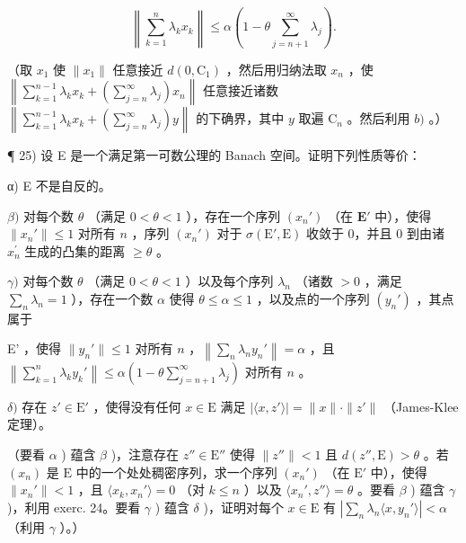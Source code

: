 \[
\left\| \sum_ {k = 1} ^ {n} \lambda_ {k} x _ {k} \right\| \leqslant \alpha (1 - \theta \sum_ {j = n + 1} ^ {\infty} \lambda_ {j}).
\]

（取 \(x_{1}\) 使 \(\| x_{1}\|\) 任意接近 \(d(0, \mathrm{C}_{1})\) ，然后用归纳法取 \(x_{n}\) ，使 \(\left\| \sum_{k=1}^{n-1} \lambda_{k} x_{k} + \left(\sum_{j=n}^{\infty} \lambda_{j}\right) x_{n}\right\|\) 任意接近诸数 \(\left\| \sum_{k=1}^{n-1} \lambda_{k} x_{k} + \left(\sum_{j=n}^{\infty} \lambda_{j}\right) y\right\|\) 的下确界，其中 \(y\) 取遍 \(\mathrm{C}_n\) 。然后利用 \(b)\) 。）

¶ 25) 设 E 是一个满足第一可数公理的 Banach 空间。证明下列性质等价：

α) E 不是自反的。

\(\beta)\) 对每个数 \(\theta\) （满足 \(0 < \theta < 1\) ），存在一个序列 \((x_n')\) （在 \(\mathbf{E}'\) 中），使得 \(\| x_n'\| \leqslant 1\) 对所有 \(n\) ，序列 \((x_n')\) 对于 \(\sigma (\mathrm{E}',\mathrm{E})\) 收敛于 0，并且 0 到由诸 \(x_{n}^{\prime}\) 生成的凸集的距离 \(\geqslant \theta\) 。

\(\gamma)\) 对每个数 \(\theta\) （满足 \(0 < \theta < 1\) ）以及每个序列 \(\lambda_{n}\) （诸数 \(>0\) ，满足 \(\sum_{n} \lambda_{n} = 1\) ），存在一个数 \(\alpha\) 使得 \(\theta \leqslant \alpha \leqslant 1\) ，以及点的一个序列 \((y_{n}')\) ，其点属于

E' ，使得 \(\| y_n'\| \leqslant 1\) 对所有 \(n\) ，\(\left\| \sum_{n}\lambda_ny_n'\right\| = \alpha\) ，且 \(\left\| \sum_{k=1}^{n}\lambda_ky_k'\right\| \leqslant \alpha (1 - \theta \sum_{j=n+1}^{\infty}\lambda_j)\) 对所有 \(n\) 。

\(\delta)\) 存在 \(z' \in \mathrm{E}'\) ，使得没有任何 \(x \in \mathrm{E}\) 满足 \(\left|\langle x, z' \rangle\right| = \| x \| \cdot \| z'\|\) （James-Klee 定理）。

（要看 \(\alpha\) ) 蕴含 \(\beta\) )，注意存在 \(z'' \in \mathrm{E}''\) 使得 \(\| z'' \| < 1\) 且 \(d(z'', \mathrm{E}) > \theta\) 。若 \((x_n)\) 是 \(\mathrm{E}\) 中的一个处处稠密序列，求一个序列 \((x_n')\) （在 \(\mathrm{E}'\) 中），使得 \(\| x_n' \| < 1\) ，且 \(\langle x_k, x_n' \rangle = 0\) （对 \(k \leqslant n\) ）以及 \(\langle x_n', z'' \rangle = \theta\) 。要看 \(\beta\) ) 蕴含 \(\gamma\) )，利用 exerc. 24。要看 \(\gamma\) ) 蕴含 \(\delta\) )，证明对每个 \(x \in \mathrm{E}\) 有 \(|\sum_{n} \lambda_n \langle x, y_n' \rangle| < \alpha\) （利用 \(\gamma\) ）。）


